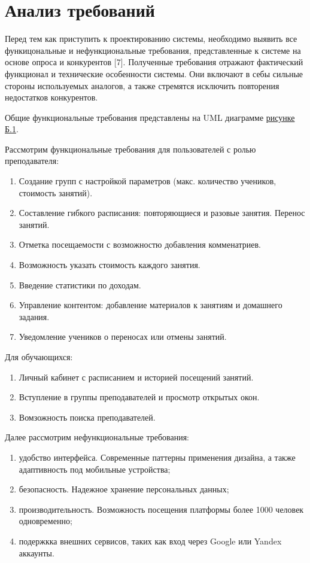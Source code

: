 \documentclass[a4paper,14pt,oneside]{extreport}
\begin{document}
\section{Анализ требований}

Перед тем как приступить к проектированию системы, необходимо выявить все функицональные и нефункциональные требования, представленные к системе на основе опроса и конкурентов [7]. Полученные требования отражают фактический функционал и технические особенности системы. Они включают в себы сильные стороны используемых аналогов, а также стремятся исключить повторения недостатков конкурентов.

Общие функциональные требования представлены на UML диаграмме 
\hypertarget{pi10}{\hyperlink{pic10_text}{рисунке Б.1}}.

Рассмотрим функциональные требования для пользователей с ролью преподавателя:

\begin{enumerate}
    \item Создание групп с настройкой параметров (макс. количество учеников, стоимость занятий).
    \item Составление гибкого расписания: повторяющиеся и разовые занятия. Перенос занятий.
    \item Отметка посещаемости с возможностю добавления комменатриев.
    \item Возможность указать стоимость каждого занятия.
    \item Введение статистики по доходам.
    \item Управление контентом: добавление материалов к занятиям и домашнего задания.
    \item Уведомление учеников о переносах или отмены занятий.
\end{enumerate}

Для обучающихся:

\begin{enumerate}
    \item Личный кабинет с расписанием и историей посещений занятий.
    \item Вступление в группы преподавателей и просмотр открытых окон.
    \item Вомзожность поиска преподавателей.
\end{enumerate}

Далее рассмотрим нефункциональные требования:

\begin{enumerate}[label=\arabic*)]
    \item удобство интерфейса. Современные паттерны применения дизайна, а также адаптивность под мобильные устройства;
    \item безопасность. Надежное хранение персональных данных;
    \item производительность. Возможность посещения платформы более 1000 человек одновременно;
    \item подержкка внешних сервисов, таких как вход через Google или Yandex аккаунты.
\end{enumerate}
\end{document}
